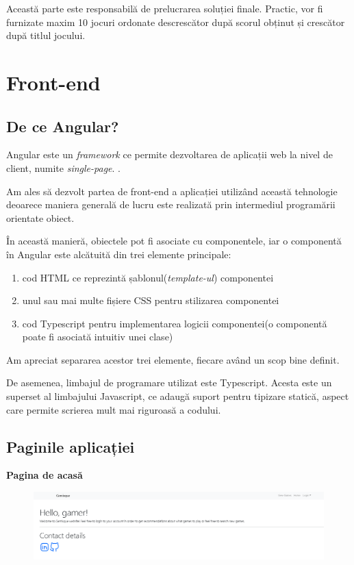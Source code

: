 \documentclass[12pt,a4paper]{report}
\begin{document}
Această parte este responsabilă de prelucrarea soluției finale. Practic, vor fi furnizate maxim 10 jocuri ordonate descrescător după scorul obținut și crescător după titlul jocului.

\section{Front-end}

\subsection{De ce Angular?}

Angular este un \emph{framework} ce permite dezvoltarea de aplicații web la nivel de client, numite \emph{single-page}. \cite{31}.

Am ales să dezvolt partea de front-end a aplicației utilizând această tehnologie deoarece maniera generală de lucru este realizată prin intermediul programării orientate obiect.

În această manieră, obiectele pot fi asociate cu componentele, iar o componentă în Angular este alcătuită din trei elemente principale:

\begin{enumerate}
  \item cod HTML ce reprezintă șablonul(\emph{template-ul}) componentei
  \item unul sau mai multe fișiere CSS pentru stilizarea componentei
  \item cod Typescript pentru implementarea logicii componentei(o componentă poate fi asociată intuitiv unei clase) 
\end{enumerate}

Am apreciat separarea acestor trei elemente, fiecare având un scop bine definit.

De asemenea, limbajul de programare utilizat este Typescript. Acesta este un superset al limbajului Javascript, ce adaugă suport pentru tipizare statică, aspect care permite scrierea mult mai riguroasă a codului.

\subsection{Paginile aplicației}

\bigskip
\textbf{Pagina de acasă}
\bigskip

\begin{figure}[H]
\centering
\caption{}
\begin{adjustbox}{max size={\textwidth}{\textheight}}
\includegraphics{exemplu_30_home_page}
\end{adjustbox}

\caption*{}
\end{figure}
\end{document}
